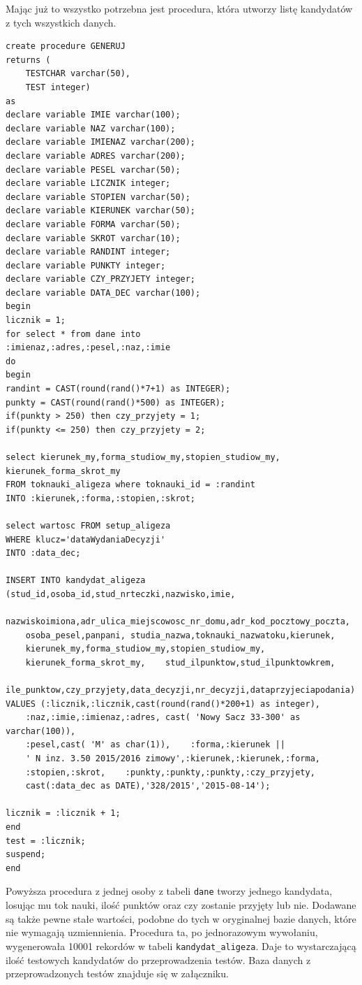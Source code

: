 Mając już to wszystko potrzebna jest procedura, która utworzy listę kandydatów z tych wszystkich danych. 

\begin{lstlisting}
create procedure GENERUJ
returns (
    TESTCHAR varchar(50),
    TEST integer)
as
declare variable IMIE varchar(100);
declare variable NAZ varchar(100);
declare variable IMIENAZ varchar(200);
declare variable ADRES varchar(200);
declare variable PESEL varchar(50);
declare variable LICZNIK integer;
declare variable STOPIEN varchar(50);
declare variable KIERUNEK varchar(50);
declare variable FORMA varchar(50);
declare variable SKROT varchar(10);
declare variable RANDINT integer;
declare variable PUNKTY integer;
declare variable CZY_PRZYJETY integer;
declare variable DATA_DEC varchar(100);
begin
licznik = 1;
for select * from dane into
:imienaz,:adres,:pesel,:naz,:imie
do
begin
randint = CAST(round(rand()*7+1) as INTEGER);
punkty = CAST(round(rand()*500) as INTEGER);
if(punkty > 250) then czy_przyjety = 1;
if(punkty <= 250) then czy_przyjety = 2;

select kierunek_my,forma_studiow_my,stopien_studiow_my,
kierunek_forma_skrot_my
FROM toknauki_aligeza where toknauki_id = :randint
INTO :kierunek,:forma,:stopien,:skrot;

select wartosc FROM setup_aligeza 
WHERE klucz='dataWydaniaDecyzji'
INTO :data_dec;

INSERT INTO kandydat_aligeza (stud_id,osoba_id,stud_nrteczki,nazwisko,imie,
	nazwiskoimiona,adr_ulica_miejscowosc_nr_domu,adr_kod_pocztowy_poczta,
	osoba_pesel,panpani, studia_nazwa,toknauki_nazwatoku,kierunek, 
	kierunek_my,forma_studiow_my,stopien_studiow_my,
	kierunek_forma_skrot_my,    stud_ilpunktow,stud_ilpunktowkrem,
	ile_punktow,czy_przyjety,data_decyzji,nr_decyzji,dataprzyjeciapodania)
VALUES (:licznik,:licznik,cast(round(rand()*200+1) as integer),
	:naz,:imie,:imienaz,:adres, cast( 'Nowy Sacz 33-300' as varchar(100)),
	:pesel,cast( 'M' as char(1)),    :forma,:kierunek || 
	' N inz. 3.50 2015/2016 zimowy',:kierunek,:kierunek,:forma,
	:stopien,:skrot,    :punkty,:punkty,:punkty,:czy_przyjety,
	cast(:data_dec as DATE),'328/2015','2015-08-14');

licznik = :licznik + 1;
end
test = :licznik;
suspend;
end
\end{lstlisting}
Powyższa procedura z jednej osoby z tabeli \texttt{dane} tworzy jednego kandydata, losując mu tok nauki, ilość punktów oraz czy zostanie przyjęty lub nie. Dodawane są także pewne stałe wartości, podobne do tych w oryginalnej bazie danych, które nie wymagają uzmiennienia. Procedura ta, po jednorazowym wywołaniu, wygenerowała 10001 rekordów w tabeli \texttt{kandydat\_aligeza}. Daje to wystarczającą ilość testowych kandydatów do przeprowadzenia testów. Baza danych z przeprowadzonych testów znajduje się w załączniku.

